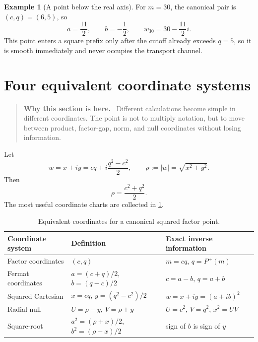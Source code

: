 \documentclass[11pt]{article}
\theoremstyle{definition}
\newtheorem{example}[theorem]{Example}
\theoremstyle{remark}
\newcommand{\Pplus}{P^{+}}
\newcommand{\1}{\mathbf{1}}
\newenvironment{motivation}
  {\begin{quote}\small\color{ovvogray}\textbf{Why this section is here.}\ }
  {\end{quote}}
\begin{document}
\begin{example}[A point below the real axis]
For $m=30$, the canonical pair is $(c,q)=(6,5)$, so
\[
 a=\frac{11}{2},
 \qquad
 b=-\frac12,
 \qquad
 w_{30}=30-\frac{11}{2}i.
\]
This point enters a square prefix only after the cutoff already exceeds $q=5$, so it is smooth immediately and never occupies the transport channel.
\end{example}

\section{Four equivalent coordinate systems}
\label{sec:coordinates}

\begin{motivation}
Different calculations become simple in different coordinates.  The point is not to multiply notation, but to move between product, factor-gap, norm, and null coordinates without losing information.
\end{motivation}

Let
\begin{equation}
 w=x+iy
 =cq+i\frac{q^2-c^2}{2},
 \qquad
 \rho:=|w|=\sqrt{x^2+y^2}.
 \label{eq:w-rho}
\end{equation}
Then
\begin{equation}
 \rho=\frac{c^2+q^2}{2}.
 \label{eq:rho-cq}
\end{equation}
The most useful coordinate charts are collected in \cref{tab:coordinates}.

\begin{table}[htbp]
\centering
\caption{Equivalent coordinates for a canonical squared factor point.}
\label{tab:coordinates}
\renewcommand{\arraystretch}{1.35}
\begin{tabular}{>{\raggedright\arraybackslash}p{} >{\raggedright\arraybackslash}p{} >{\raggedright\arraybackslash}p{}}
\toprule
Coordinate system & Definition & Exact inverse information\\
\midrule
Factor coordinates & $(c,q)$ & $m=cq$, $q=\Pplus(m)$\\
Fermat coordinates & $a=(c+q)/2$, $b=(q-c)/2$ & $c=a-b$, $q=a+b$\\
Squared Cartesian & $x=cq$, $y=(q^2-c^2)/2$ & $w=x+iy=(a+ib)^2$\\
Radial-null & $U=\rho-y$, $V=\rho+y$ & $U=c^2$, $V=q^2$, $x^2=UV$\\
Square-root & $a^2=(\rho+x)/2$, $b^2=(\rho-x)/2$ & sign of $b$ is sign of $y$\\
\bottomrule
\end{tabular}
\end{table}
\end{document}
